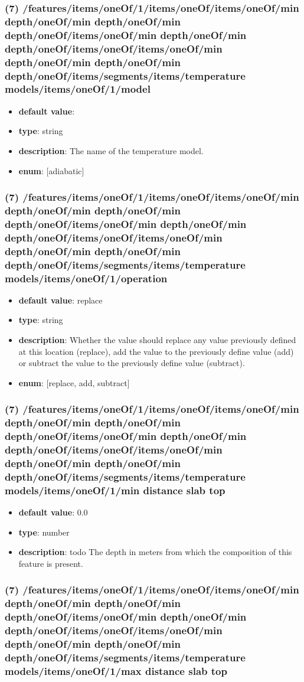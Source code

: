 \subsubsection{(7) /features/items/oneOf/1/items/oneOf/items/oneOf/min depth/oneOf/min depth/oneOf/min depth/oneOf/items/oneOf/min depth/oneOf/min depth/oneOf/items/oneOf/items/oneOf/min depth/oneOf/min depth/oneOf/min depth/oneOf/items/segments/items/temperature models/items/oneOf/1/model}
\begin{itemize}[leftmargin=7em]\item {\bf default value}: 
\item {\bf type}: string
\item {\bf description}: The name of the temperature model.
\item {\bf enum}: [adiabatic]\end{itemize}\subsubsection{(7) /features/items/oneOf/1/items/oneOf/items/oneOf/min depth/oneOf/min depth/oneOf/min depth/oneOf/items/oneOf/min depth/oneOf/min depth/oneOf/items/oneOf/items/oneOf/min depth/oneOf/min depth/oneOf/min depth/oneOf/items/segments/items/temperature models/items/oneOf/1/operation}
\begin{itemize}[leftmargin=7em]\item {\bf default value}: replace
\item {\bf type}: string
\item {\bf description}: Whether the value should replace any value previously defined at this location (replace), add the value to the previously define value (add) or subtract the value to the previously define value (subtract).
\item {\bf enum}: [replace, add, subtract]\end{itemize}\subsubsection{(7) /features/items/oneOf/1/items/oneOf/items/oneOf/min depth/oneOf/min depth/oneOf/min depth/oneOf/items/oneOf/min depth/oneOf/min depth/oneOf/items/oneOf/items/oneOf/min depth/oneOf/min depth/oneOf/min depth/oneOf/items/segments/items/temperature models/items/oneOf/1/min distance slab top}
\begin{itemize}[leftmargin=7em]\item {\bf default value}: 0.0
\item {\bf type}: number
\item {\bf description}: todo The depth in meters from which the composition of this feature is present.
\end{itemize}\subsubsection{(7) /features/items/oneOf/1/items/oneOf/items/oneOf/min depth/oneOf/min depth/oneOf/min depth/oneOf/items/oneOf/min depth/oneOf/min depth/oneOf/items/oneOf/items/oneOf/min depth/oneOf/min depth/oneOf/min depth/oneOf/items/segments/items/temperature models/items/oneOf/1/max distance slab top}
